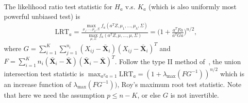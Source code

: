 \documentclass[review]{elsarticle}
\theoremstyle{plain}
\theoremstyle{definition}
\theoremstyle{remark}
\begin{document}
The likelihood ratio test statistic for $H_a$ v.s. $K_a$ (which is also uniformly most powerful unbiased test) is
\begin{equation*}
    \begin{aligned}
        \text{LRT}_{a}=\frac{\max_{\mu_1,\ldots,\mu_k,\Sigma}f_a(a^T Z,\mu_1,\ldots,\mu_k,\Sigma)}{\max_{\mu,\Sigma}f_a(a^T Z,\mu,\ldots,\mu,\Sigma)}
        =
        \Big(1+\frac{a^T Fa}{a^T G a}\Big)^{n/2},
    \end{aligned}
\end{equation*}
where $G=\sum_{i=1}^K\sum_{j=1}^{n_i}(X_{ij}-\bar{\mathbf{X}}_i)(X_{ij}-\bar{\mathbf{X}}_i)^T$ and $F=\sum_{i=1}^K n_i (\bar{\mathbf{X}}_i-\bar{\mathbf{X}})(\bar{\mathbf{X}}_i-\bar{\mathbf{X}})^T$.
Follow the type II method of~\cite{Roy1953}, the union intersection test statistic is $\max_{a^T a=1}\text{LRT}_a=(1+\lambda_{\max}(FG^{-1}))^{n/2}$ which is an increase function of $\lambda_{\max}(FG^{-1}))$, Roy's maximum root test statistic.
Note that here we need the assumption $p\leq n-K$, or else $G$ is not invertible.
\end{document}
